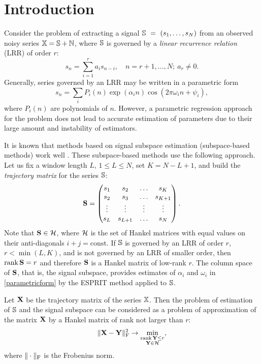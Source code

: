\documentclass[sii]{ipart}
\def\rank{\mathop{\mathrm{rank}}}
\begin{document}
\section{Introduction}
Consider the problem of extracting a signal $\mathbb{S}~=~(s_1, \ldots, s_N)$ from an observed noisy series $\mathbb{X} = \mathbb{S} + \mathbb{N}$, where $\mathbb{S}$ is governed by a \emph{linear recurrence relation} (LRR) of order $r$:
\begin{equation*}
s_n = \sum_{i = 1}^{r} a_i s_{n-i}, \quad n = r + 1, \ldots, N;\  a_r\neq 0.
\end{equation*}
Generally, series governed by an LRR may be written in a parametric form
\begin{equation} \label{parametricform}
s_n = \sum_i P_i(n) \exp(\alpha_i n) \cos(2 \pi \omega_i n + \psi_i),
\end{equation}
where $P_i(n)$ are polynomials of $n$. However, a parametric regression approach for the problem does not lead to accurate estimation of parameters due to their large amount and instability of estimators.

It is known that methods based on signal subspace estimation (subspace-based methods) work well \cite{Broomhead.King1986, Vautard.etal1992, Elsner.Tsonis1996, Golyandina.etal2001}. These subspace-based methods use the following approach. Let us fix a window length $L$, $1 \le L \le N$, set $K = N - L + 1$, and build the \emph{trajectory matrix} for the series $\mathbb{S}$:
\begin{equation*}
\bfS = \begin{pmatrix}
s_1 & s_2 & \ldots & s_K \\
s_2 & s_3 & \ldots & s_{K + 1} \\
\vdots & \vdots & \vdots & \vdots \\
s_L & s_{L + 1} & \ldots & s_N
\end{pmatrix}.
\end{equation*}
Note that $\mathbf{S}\in \mathcal{H}$, where $\mathcal{H}$ is the set of Hankel matrices with equal values on their anti-diagonals $i+j=\mathrm{const}$.
If $\mathbb{S}$ is governed by an LRR of order $r$, $r < \min(L, K)$, and is not governed by an LRR of smaller order, then $\rank \bfS = r$ and therefore $\mathbf{S}$ is a Hankel matrix of low-rank $r$. The column space of $\mathbf{S}$, that is, the  signal subspace, provides estimates of $\alpha_i$ and $\omega_i$ in \eqref{parametricform} by the ESPRIT method \cite{Roy.Kailath1989, Golyandina.Zhigljavsky2012} applied to $\mathbb{S}$.

Let $\mathbf{X}$ be the trajectory matrix of the series $\mathbb{X}$. Then the problem of estimation of $\mathbb{S}$ and the signal subspace can be considered as a problem of approximation of the matrix $\mathbf{X}$ by a Hankel matrix of rank not larger than $r$:
\begin{equation}\label{introd_task}
\|\bfX - \bfY\|^2_\rmF \to \min_{\substack{\rank \bfY \le r \\ \bfY \in \calH}},
\end{equation}
where $\|\cdot\|_{\mathrm{F}}$ is the Frobenius norm.
\end{document}
